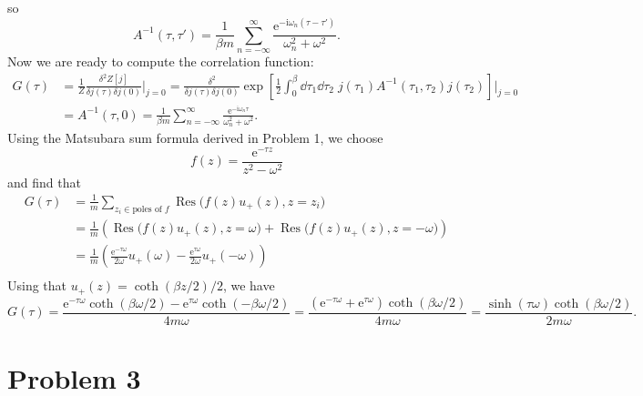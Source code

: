\documentclass{article}
\newcommand{\ii}{\mathrm{i}}
\newcommand{\me}{\mathrm{e}}
\begin{document}
so
\begin{equation}
    A^{-1}(\tau,\tau') = \frac{1}{\beta m} \sum_{n=-\infty}^{\infty} \frac{\me^{-\ii \omega_n (\tau-\tau')}}{\omega_n^2 + \omega^2}.
\end{equation}
Now we are ready to compute the correlation function:
\begin{equation}
    \begin{split}
        G(\tau) & =\frac{1}{Z}\frac{\delta^2 Z[j]}{\delta j(\tau)\delta j(0)}\Bigg|_{j=0} = \frac{\delta^2}{\delta j(\tau)\delta j(0)} \exp\left[\frac{1}{2}\int_0^{\beta} \dd{\tau_1} \dd{\tau_2} \; j(\tau_1) A^{-1}(\tau_1,\tau_2) j(\tau_2)\right]\Bigg|_{j=0} \\
                & =A^{-1}(\tau,0) = \frac{1}{\beta m} \sum_{n=-\infty}^{\infty} \frac{\me^{-\ii \omega_n \tau}}{\omega_n^2 + \omega^2}.
    \end{split}
\end{equation}
Using the Matsubara sum formula derived in Problem 1, we choose 
\begin{equation}
    f(z) = \frac{\me^{-\tau z}}{z^2 - \omega^2}
\end{equation}
and find that
\begin{equation}
    \begin{split}
        G(\tau) &= \frac{1}{m}\sum_{z_i\in\text{poles of }f} \operatorname*{Res}\big(f(z)u_+(z), z=z_i\big)\\
                &= \frac{1}{m}(\operatorname*{Res}\big(f(z)u_+(z), z=\omega\big) + \operatorname*{Res}\big(f(z)u_+(z), z=-\omega\big))\\
                &= \frac{1}{m}\left(\frac{\me^{-\tau \omega}}{2\omega}u_+(\omega) - \frac{\me^{\tau \omega}}{2\omega}u_+(-\omega)\right)\\
    \end{split}
\end{equation}
Using that $u_+(z)=\coth(\beta z/2)/2$, we have 
\begin{equation}
    G(\tau) = \frac{\me^{-\tau\omega}\coth(\beta\omega/2)-\me^{\tau\omega}\coth(-\beta\omega/2)}{4m\omega}=\frac{(\me^{-\tau\omega}+\me^{\tau\omega})\coth(\beta\omega/2)}{4m\omega}=\frac{\sinh(\tau\omega)\coth(\beta\omega/2)}{2m\omega}.
\end{equation}


\section*{Problem 3}
\end{document}

